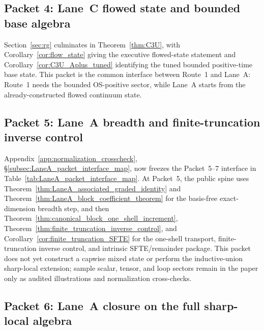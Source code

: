\subsection{Packet 4: Lane~C flowed state and bounded base algebra}

Section~\ref{sec:rg} culminates in Theorem~\ref{thm:C3U}, with Corollary~\ref{cor:flow_state} giving the executive flowed-state statement and Corollary~\ref{cor:C3U_Aplus_tuned} identifying the tuned bounded positive-time base state.
This packet is the common interface between Route~1 and Lane~A: Route~1 needs the bounded OS-positive sector, while Lane~A starts from the already-constructed flowed continuum state.

\subsection{Packet 5: Lane~A breadth and finite-truncation inverse control}

Appendix~\ref{app:normalization_crosscheck}, \S\ref{subsec:LaneA_packet_interface_map}, now freezes the Packet~5--7 interface in Table~\ref{tab:LaneA_packet_interface_map}.
At Packet~5, the public spine uses Theorem~\ref{thm:LaneA_associated_graded_identity} and Theorem~\ref{thm:LaneA_block_coefficient_theorem} for the basis-free exact-dimension breadth step, and then Theorem~\ref{thm:canonical_block_one_shell_increment}, Theorem~\ref{thm:finite_truncation_inverse_control}, and Corollary~\ref{cor:finite_truncation_SFTE} for the one-shell transport, finite-truncation inverse control, and intrinsic SFTE/remainder package.
This packet does not yet construct a capwise mixed state or perform the inductive-union sharp-local extension; sample scalar, tensor, and loop sectors remain in the paper only as audited illustrations and normalization cross-checks.

\subsection{Packet 6: Lane~A closure on the full sharp-local algebra}

